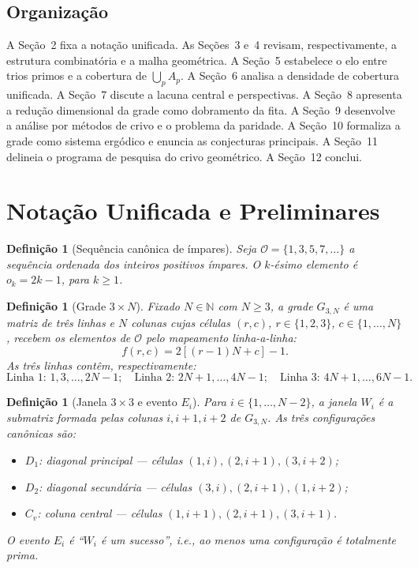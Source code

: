 \documentclass[12pt,a4paper]{article}
\newtheorem{definition}[theorem]{Defini\c{c}\~ao}
\theoremstyle{remark}
\newcommand{\calO}{\mathcal{O}}
\newcommand{\NN}{\mathbb{N}}
\begin{document}
	\subsection*{Organiza\c{c}\~ao}
	
	A Se\c{c}\~ao~2 fixa a nota\c{c}\~ao unificada.
	As Se\c{c}\~oes~3 e~4 revisam, respectivamente, a estrutura combinat\'oria e a malha geom\'etrica.
	A Se\c{c}\~ao~5 estabelece o elo entre trios primos e a cobertura de $\bigcup_p A_p$.
	A Se\c{c}\~ao~6 analisa a densidade de cobertura unificada.
	A Se\c{c}\~ao~7 discute a lacuna central e perspectivas.
	A Se\c{c}\~ao~8 apresenta a redu\c{c}\~ao dimensional da grade como dobramento da fita.
	A Se\c{c}\~ao~9 desenvolve a an\'alise por m\'etodos de crivo e o problema da paridade.
	A Se\c{c}\~ao~10 formaliza a grade como sistema erg\'odico e enuncia as conjecturas principais.
	A Se\c{c}\~ao~11 delineia o programa de pesquisa do crivo geom\'etrico.
	A Se\c{c}\~ao~12 conclui.
	
	\section{Nota\c{c}\~ao Unificada e Preliminares}
	
	\begin{definition}[Sequência canônica de ímpares]
		Seja $\calO = \{1,3,5,7,\ldots\}$ a sequ\^encia ordenada dos inteiros positivos
		\'impares. O $k$-\'esimo elemento \'e $o_k = 2k-1$, para $k\geq 1$.
	\end{definition}
	
	\begin{definition}[Grade $3\times N$]
		Fixado $N\in\NN$ com $N\geq 3$, a grade $G_{3,N}$ \'e uma matriz de tr\^es linhas
		e $N$ colunas cujas c\'elulas $(r,c)$, $r\in\{1,2,3\}$, $c\in\{1,\ldots,N\}$,
		recebem os elementos de $\calO$ pelo mapeamento linha-a-linha:
		\[
		f(r,c) = 2[(r-1)N + c] - 1.
		\]
		As tr\^es linhas cont\^em, respectivamente:
		\[
		\text{Linha 1: } 1,3,\ldots,2N-1;\quad
		\text{Linha 2: } 2N+1,\ldots,4N-1;\quad
		\text{Linha 3: } 4N+1,\ldots,6N-1.
		\]
	\end{definition}
	
	\begin{definition}[Janela $3\times3$ e evento $E_i$]
		Para $i\in\{1,\ldots,N-2\}$, a janela $W_i$ \'e a submatriz formada
		pelas colunas $i,i+1,i+2$ de $G_{3,N}$.  As tr\^es configura\c{c}\~oes
		can\^onicas s\~ao:
		\begin{itemize}
			\item $D_1$: diagonal principal --- c\'elulas $(1,i),(2,i+1),(3,i+2)$;
			\item $D_2$: diagonal secund\'aria --- c\'elulas $(3,i),(2,i+1),(1,i+2)$;
			\item $C_v$: coluna central --- c\'elulas $(1,i+1),(2,i+1),(3,i+1)$.
		\end{itemize}
		O evento $E_i$ \'e ``$W_i$ \'e um sucesso'', i.e., ao menos uma configura\c{c}\~ao
		\'e totalmente prima.
	\end{definition}
	
\end{document}
